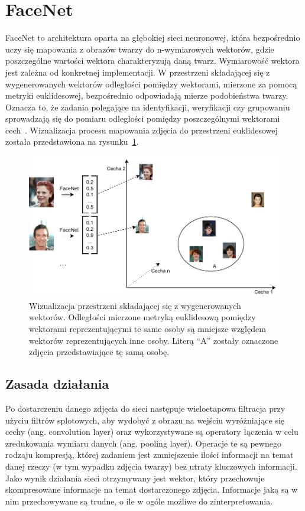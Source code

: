 \section{FaceNet}

FaceNet to architektura oparta na głębokiej sieci neuronowej, która bezpośrednio uczy się mapowania
z obrazów twarzy do n-wymiarowych wektorów, gdzie poszczególne wartości wektora charakteryzują daną twarz.
Wymiarowość wektora jest zależna od konkretnej implementacji.
W przestrzeni składającej się z wygenerowanych wektorów
odległości pomiędzy wektorami, mierzone za pomocą metryki euklidesowej,
bezpośrednio odpowiadają mierze podobieństwa twarzy.
Oznacza to, że zadania polegające na identyfikacji, weryfikacji czy grupowaniu
sprowadzają się do pomiaru odległości pomiędzy poszczególnymi wektorami cech~\cite{schroff2015facenet}.
Wizualizacja procesu mapowania zdjęcia do przestrzeni
euklidesowej została przedstawiona na rysunku~\ref{fig:facenet_zastosowanie}.

\begin{figure}[H]
    \centering
    \includegraphics[width=.8\textwidth]{images/facenet_euc}
    \caption{
        Wizualizacja przestrzeni składającej się z wygenerowanych wektorów.
        Odległości mierzone metryką euklidesową pomiędzy wektorami reprezentującymi te
        same osoby są mniejsze względem wektorów reprezentujących inne osoby.
        Literą ``A'' zostały oznaczone zdjęcia przedstawiające tę samą osobę.
    }
    \customsource
    \label{fig:facenet_zastosowanie}
\end{figure}

\pagebreak

\subsection{Zasada działania}


Po dostarczeniu danego zdjęcia do sieci następuje wieloetapowa filtracja przy użyciu filtrów splotowych,
aby wydobyć z obrazu na wejściu wyróżniające się cechy (ang. convolution layer)
oraz wykorzystywane są operatory łączenia w celu zredukowania wymiaru danych (ang. pooling layer).
Operacje te są pewnego rodzaju kompresją, której zadaniem jest zmniejszenie ilości informacji
na temat danej rzeczy (w tym wypadku zdjęcia twarzy) bez utraty kluczowych informacji.
Jako wynik działania sieci otrzymywany jest wektor,
który przechowuje skompresowane informacje na temat dostarczonego zdjęcia.
Informacje jaką są w nim przechowywane są trudne, o ile w ogóle możliwe do zinterpretowania.

